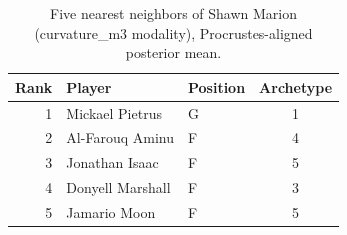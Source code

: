 \begin{table}[htbp]
  \centering\small
  \begin{tabular}{rllc}
    \toprule
    Rank & Player & Position & Archetype \\
    \midrule
    1 & Mickael Pietrus & G & 1 \\
    2 & Al-Farouq Aminu & F & 4 \\
    3 & Jonathan Isaac & F & 5 \\
    4 & Donyell Marshall & F & 3 \\
    5 & Jamario Moon & F & 5 \\
    \bottomrule
  \end{tabular}
  \caption{Five nearest neighbors of Shawn Marion (curvature_m3 modality), Procrustes-aligned posterior mean.}
  \label{tab:Shawn_Marion_neighbors_curvature_m3}
\end{table}

